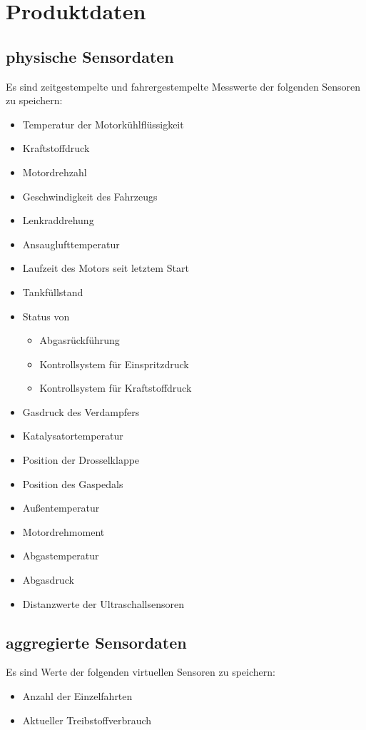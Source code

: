 \documentclass[pflichtenheft.tex]{subfiles}
\begin{document}
\chapter{Produktdaten}

\section{\mkd physische Sensordaten}
Es sind zeitgestempelte und fahrergestempelte Messwerte der folgenden Sensoren zu speichern:
\begin{itemize}
\item
Temperatur der Motorkühlflüssigkeit
\item
Kraftstoffdruck
\item
Motordrehzahl
\item
Geschwindigkeit des Fahrzeugs
\item
Lenkraddrehung
\item
Ansauglufttemperatur 
\item
Laufzeit des Motors seit letztem Start
\item
Tankfüllstand
\item
Status von
\begin{itemize}
\item Abgasrückführung
\item Kontrollsystem für Einspritzdruck
\item Kontrollsystem für Kraftstoffdruck
\end{itemize}
\item
Gasdruck des Verdampfers
\item
Katalysatortemperatur
\item
Position der Drosselklappe
\item
Position des Gaspedals
\item
Außentemperatur
\item
Motordrehmoment
\item
Abgastemperatur
\item
Abgasdruck
\item
Distanzwerte der Ultraschallsensoren

\end{itemize}

\section{\mkd aggregierte Sensordaten}
Es sind Werte der folgenden virtuellen Sensoren zu speichern:
\begin{itemize}
\item Anzahl der Einzelfahrten
\item Aktueller Treibstoffverbrauch


\end{itemize}
\end{document}
